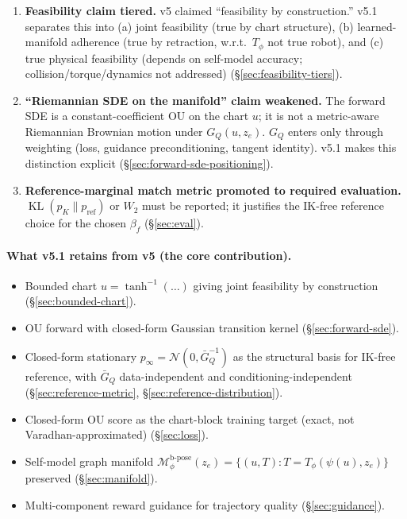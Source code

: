 \documentclass[11pt,a4paper]{article}
\DeclareMathOperator{\KL}{KL}
\newcommand{\N}{\mathcal{N}}
\newcommand{\Mbpose}{\mathcal{M}_\phi^{\text{b-pose}}}
\newcommand{\Tphi}{T_\phi}
\newcommand{\GQ}{G_Q}
\newcommand{\GQbar}{\bar G_Q}
\begin{document}
\begin{enumerate}[noitemsep, leftmargin=*]
    \item \textbf{Feasibility claim tiered.} v5 claimed ``feasibility by construction.'' v5.1 separates this into (a) joint feasibility (true by chart structure), (b) learned-manifold adherence (true by retraction, w.r.t.\ $\Tphi$ not true robot), and (c) true physical feasibility (depends on self-model accuracy; collision/torque/dynamics not addressed) (\S\ref{sec:feasibility-tiers}).
    \item \textbf{``Riemannian SDE on the manifold'' claim weakened.} The forward SDE is a constant-coefficient OU on the chart $u$; it is not a metric-aware Riemannian Brownian motion under $\GQ(u, z_e)$. $\GQ$ enters only through weighting (loss, guidance preconditioning, tangent identity). v5.1 makes this distinction explicit (\S\ref{sec:forward-sde-positioning}).
    \item \textbf{Reference-marginal match metric promoted to required evaluation.} $\KL(p_K \| p_\text{ref})$ or $W_2$ must be reported; it justifies the IK-free reference choice for the chosen $\beta_f$ (\S\ref{sec:eval}).
\end{enumerate}

\paragraph{What v5.1 retains from v5 (the core contribution).}
\begin{itemize}[noitemsep]
    \item Bounded chart $u = \tanh^{-1}(\ldots)$ giving joint feasibility by construction (\S\ref{sec:bounded-chart}).
    \item OU forward with closed-form Gaussian transition kernel (\S\ref{sec:forward-sde}).
    \item Closed-form stationary $p_\infty = \N(0, \GQbar^{-1})$ as the structural basis for IK-free reference, with $\GQbar$ data-independent and conditioning-independent (\S\ref{sec:reference-metric}, \S\ref{sec:reference-distribution}).
    \item Closed-form OU score as the chart-block training target (exact, not Varadhan-approximated) (\S\ref{sec:loss}).
    \item Self-model graph manifold $\Mbpose(z_e) = \{(u, T) : T = \Tphi(\psi(u), z_e)\}$ preserved (\S\ref{sec:manifold}).
    \item Multi-component reward guidance for trajectory quality (\S\ref{sec:guidance}).
\end{itemize}
\end{document}
